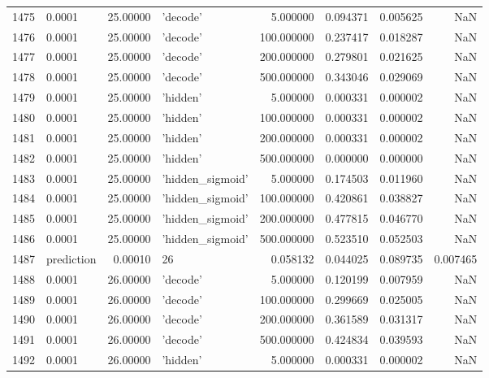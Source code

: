 \documentclass[10pt,a4paper]{article}
\begin{document}
\begin{tabular}{llrlrrrr}
1475 &      0.0001 &  25.00000 &           'decode' &    5.000000 &  0.094371 &  0.005625 &       NaN \\
1476 &      0.0001 &  25.00000 &           'decode' &  100.000000 &  0.237417 &  0.018287 &       NaN \\
1477 &      0.0001 &  25.00000 &           'decode' &  200.000000 &  0.279801 &  0.021625 &       NaN \\
1478 &      0.0001 &  25.00000 &           'decode' &  500.000000 &  0.343046 &  0.029069 &       NaN \\
1479 &      0.0001 &  25.00000 &           'hidden' &    5.000000 &  0.000331 &  0.000002 &       NaN \\
1480 &      0.0001 &  25.00000 &           'hidden' &  100.000000 &  0.000331 &  0.000002 &       NaN \\
1481 &      0.0001 &  25.00000 &           'hidden' &  200.000000 &  0.000331 &  0.000002 &       NaN \\
1482 &      0.0001 &  25.00000 &           'hidden' &  500.000000 &  0.000000 &  0.000000 &       NaN \\
1483 &      0.0001 &  25.00000 &   'hidden\_sigmoid' &    5.000000 &  0.174503 &  0.011960 &       NaN \\
1484 &      0.0001 &  25.00000 &   'hidden\_sigmoid' &  100.000000 &  0.420861 &  0.038827 &       NaN \\
1485 &      0.0001 &  25.00000 &   'hidden\_sigmoid' &  200.000000 &  0.477815 &  0.046770 &       NaN \\
1486 &      0.0001 &  25.00000 &   'hidden\_sigmoid' &  500.000000 &  0.523510 &  0.052503 &       NaN \\
1487 &  prediction &   0.00010 &                 26 &    0.058132 &  0.044025 &  0.089735 &  0.007465 \\
1488 &      0.0001 &  26.00000 &           'decode' &    5.000000 &  0.120199 &  0.007959 &       NaN \\
1489 &      0.0001 &  26.00000 &           'decode' &  100.000000 &  0.299669 &  0.025005 &       NaN \\
1490 &      0.0001 &  26.00000 &           'decode' &  200.000000 &  0.361589 &  0.031317 &       NaN \\
1491 &      0.0001 &  26.00000 &           'decode' &  500.000000 &  0.424834 &  0.039593 &       NaN \\
1492 &      0.0001 &  26.00000 &           'hidden' &    5.000000 &  0.000331 &  0.000002 &       NaN \\

\end{tabular}
\end{document}
